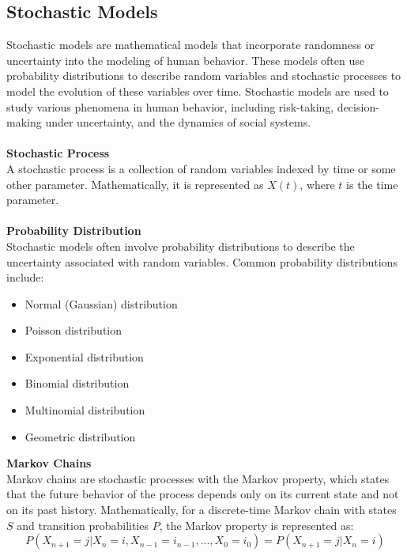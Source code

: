 \documentclass[12pt]{report}
\begin{document}
\subsection{Stochastic Models}\label{sm}
Stochastic models are mathematical models that incorporate randomness or
uncertainty into the modeling of human behavior. These models often use
probability distributions to describe random variables and stochastic
processes to model the evolution of these variables over time. Stochastic
models are used to study various phenomena in human behavior, including
risk-taking, decision-making under uncertainty, and the dynamics of social
systems.\\
\\
\textbf{Stochastic Process}\\
A stochastic process is a collection of random variables indexed by time or some other
parameter. Mathematically, it is represented as \( X(t) \), where \( t \) is the time parameter.\\
\\
\noindent \textbf{Probability Distribution}\\
Stochastic models often involve probability distributions to describe the uncertainty
associated with random variables. Common probability distributions include:\\
\begin{itemize}
   \item Normal (Gaussian) distribution
   \item Poisson distribution
   \item Exponential distribution
   \item Binomial distribution
   \item Multinomial distribution
   \item Geometric distribution
\end{itemize}
\noindent \textbf{Markov Chains}\\
Markov chains are stochastic processes with the Markov property, which states that the future
behavior of the process depends only on its current state and not on its past history.
Mathematically, for a discrete-time Markov chain with states \( S \) and transition
probabilities \( P \), the Markov property is represented as:\\
\begin{equation}
    P(X_{n+1} = j | X_n = i, X_{n-1} = i_{n-1}, ..., X_0 = i_0) = P(X_{n+1} = j | X_n = i)
\end{equation}
\\
\end{document}
